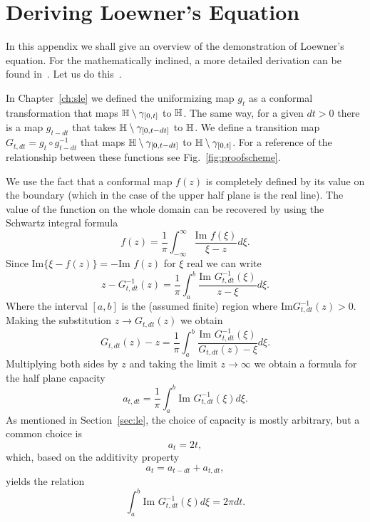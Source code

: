 \chapter{Deriving Loewner's Equation}
\label{ch:proof}

In this appendix we shall give an overview of the demonstration of Loewner's
equation. For the mathematically inclined, a more detailed derivation can be
found in~\cite{delMonaco2013}. Let us do this~\cite{Kager2004}.

In Chapter~\ref{ch:sle} we defined the uniformizing map $g_t$ as a conformal
transformation that maps $\mathbb{H}\setminus\gamma_{[0,t]}$ to $\mathbb{H}$. The same way,
for a given $dt>0$ there is a map $g_{t-dt}$ that takes
$\mathbb{H}\setminus\gamma_{[0,t-dt]}$ to $\mathbb{H}$. We define a transition map
$G_{t,dt}=g_t\circ g_{t-dt}^{-1}$ that maps
$\mathbb{H}\setminus\gamma_{[0,t-dt]}$ to $\mathbb{H}\setminus\gamma_{[0,t]}$. For a
reference of the relationship between these functions see
Fig.~\ref{fig:proofscheme}.


We use the fact that a conformal map $f(z)$ is completely defined by its value
on the boundary (which in the case of the upper half plane is the real line).
The value of the function on the whole domain can be recovered by using the
Schwartz integral formula~\cite{Ahlfors1979}
\begin{equation}
    f\left(z\right)=
    \frac{1}{\pi}\int_{-\infty}^{\infty}
    \frac{\mbox{Im }f\left(\xi\right)}{\xi-z}d\xi.
\end{equation}
Since $\mbox{Im}\{\xi - f(z)\}=-\mbox{Im }f(z)$ for $\xi$ real we can write
\begin{equation}
    z-G_{t,dt}^{-1}\left(z\right)=
    \frac{1}{\pi}\int_{a}^{b}
    \frac{\mbox{Im }G_{t,dt}^{-1}\left(\xi\right)}{z-\xi}d\xi.
\end{equation}
Where the interval $[a,b]$ is the (assumed finite) region where $\mbox{Im
}G_{t,dt}^{-1}(z)>0$. Making the substitution
$z\rightarrow G_{t,dt}(z)$ we obtain
\begin{equation}
    \label{eq:proof1}
    G_{t,dt}\left(z\right)-z=
    \frac{1}{\pi}\int_{a}^{b}
    \frac{\mbox{Im }G_{t,dt}^{-1}\left(\xi\right)}
    {G_{t,dt}\left(z\right)-\xi}d\xi.
\end{equation}
Multiplying both sides by $z$ and taking the limit $z\rightarrow\infty$ we
obtain a formula for the half plane capacity
\begin{equation}
    a_{t,dt}=\frac{1}{\pi}\int_{a}^{b}
    \mbox{Im }G_{t,dt}^{-1}\left(\xi\right)d\xi.
\end{equation}
As mentioned in Section~\ref{sec:le}, the choice of capacity is mostly arbitrary, but a
common choice is
\begin{equation}
    a_t = 2t,
\end{equation}
which, based on the additivity property
\begin{equation}
    a_t = a_{t-dt} + a_{t,dt},
\end{equation}
yields the relation
\begin{equation}
    \label{eq:proof2}
    \int_{a}^{b}\mbox{Im }G_{t,dt}^{-1}\left(\xi\right)d\xi=2\pi dt.
\end{equation}

